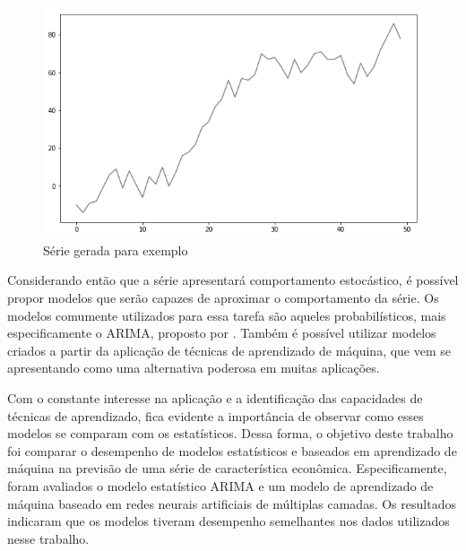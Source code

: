 \documentclass[
    12pt,
    oneside,
    a4paper,
    english,
    brazil
]{abntex2}
\begin{document}
\begin{figure}[ht]
    \centering
    \caption{Série gerada para exemplo}\label{serie0}
    \includegraphics[width=.6\linewidth]{images/serie_exemplo.png}
\end{figure}

Considerando  então  que  a  série  apresentará  comportamento  estocástico,  é
possível  propor  modelos  que  serão  capazes  de  aproximar  o  comportamento
da  série.  Os  modelos  comumente  utilizados para  essa  tarefa  são  aqueles
probabilísticos, mais especificamente o ARIMA\@, proposto por .
Também é possível utilizar modelos criados a partir da aplicação de técnicas de
aprendizado de máquina,  que vem se apresentando como  uma alternativa poderosa
em muitas aplicações.

Com o  constante interesse na  aplicação e  a identificação das  capacidades de
técnicas de  aprendizado, fica  evidente a importância  de observar  como esses
modelos se comparam com os estatísticos. Dessa forma, o objetivo deste trabalho
foi comparar o desempenho de modelos  estatísticos e baseados em aprendizado de
máquina na previsão de uma  série de característica econômica. Especificamente,
foram  avaliados  o  modelo  estatístico  ARIMA  e  um  modelo  de  aprendizado
de  máquina baseado  em  redes  neurais artificiais  de  múltiplas camadas.  Os
resultados indicaram  que os modelos  tiveram desempenho semelhantes  nos dados
utilizados nesse trabalho.


\end{document}
